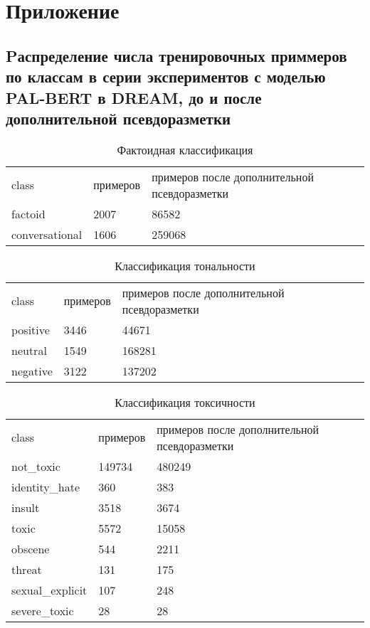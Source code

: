 \chapter{Приложение}
\section{Pаспределение числа тренировочных приммеров по классам в серии экспериментов с моделью PAL-BERT в DREAM, до и после дополнительной псевдоразметки} 


\begin{table}[htbp]
\caption{Фактоидная классификация}
\label{appendix:factoid}
\begin{tabular}{lll}
class & примеров & примеров после дополнительной псевдоразметки \\
factoid & 2007 & 86582\\
conversational & 1606 & 259068 \\
\end{tabular}
\end{table}

\begin{table}[]
\caption{Классификация тональности}
\label{appendix:sentiment}
\begin{tabular}{lll}
class & примеров & примеров после дополнительной псевдоразметки \\
positive & 3446 & 44671 \\
neutral & 1549 & 168281 \\
negative & 3122 & 137202
\end{tabular}
\end{table}


\begin{table}[]
\caption{Классификация токсичности}
\label{appendix:toxic}
\begin{tabular}{lll}
class & примеров & примеров после дополнительной псевдоразметки \\
not\_toxic & 149734 & 480249 \\
identity\_hate & 360 & 383 \\
insult & 3518 & 3674 \\
toxic & 5572 & 15058 \\
obscene & 544 & 2211 \\
threat & 131 & 175 \\
sexual\_explicit & 107 & 248 \\
severe\_toxic & 28 & 28
\end{tabular}
\end{table}


